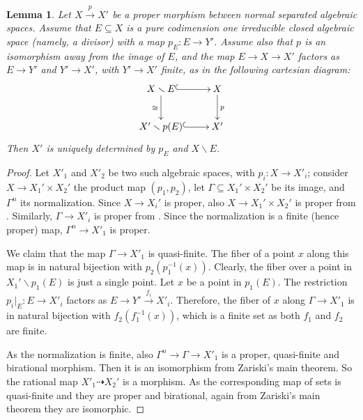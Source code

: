 \documentclass{amsart}
\newtheorem{Lemma}[theorem]{Lemma}
\theoremstyle{definition}
\begin{document}
\begin{Lemma}\label{lemma_isom_coarse_moduli_space}
    Let $X\xrightarrow{p} X'$ be a proper morphism between normal separated algebraic spaces. Assume that $E\subseteq X$ is a pure codimension one irreducible closed algebraic space (namely, a divisor) with a map $p_E:E\to Y'$. Assume also that $p$ is an isomorphism away from the image of $E$, and the map $E\to X\to X'$ factors as $E\to Y'$ and $Y'\to X'$, with $Y'\to X'$ finite, as in the following cartesian diagram:
    \[
    \xymatrix{X\smallsetminus E \ar@{^{(}->}[r]\ar[d]_\cong & X \ar[d]^p \\ X'\smallsetminus p(E)\ar@{^{(}->}[r]& X'}
    \]
    Then $X'$ is uniquely determined by $p_E$ and $X\smallsetminus E$. 
\end{Lemma}
\begin{proof}
    Let $X'_1$ and $X'_2$ be two such algebraic spaces, with $p_i:X\to X'_i$; consider $X\to X_1'\times X_2'$ the product map $(p_1, p_2)$, let $\Gamma\subseteq X_1'\times X_2'$
    be its image, and $\Gamma^n$ its normalization. Since $X\to X_i'$ is proper, also $X\to X_1'\times X_2'$ is proper from \cite[\href{https://stacks.math.columbia.edu/tag/04NX}{Tag 04NX}]{stacks-project}. Similarly, $\Gamma\to X'_i$ is proper from \cite[\href{https://stacks.math.columbia.edu/tag/0AGD}{Tag 0AGD}]{stacks-project}. Since the normalization is a finite (hence proper) map, $\Gamma^n\to X'_1$ is proper.
    
    We claim that the map $\Gamma\to X'_1$ is quasi-finite. {The fiber of a point $x$ along this map is in natural bijection with $p_2(p_1^{-1}(x))$. Clearly, the fiber over a point in $X_1'\smallsetminus p_1(E)$ is just a single point. Let $x$ be a point in  $p_1(E)$. The restriction $p_i|_E\colon E \to X'_i$ factors as $E \to Y' \overset{f_i}{\to} X'_i$. Therefore, the fiber of $x$ along $\Gamma \to X'_1$ is in natural bijection with $f_2(f_1^{-1}(x))$, which is a finite set as both $f_1$ and $f_2$ are finite.}
    
    

    As the normalization is finite, also $\Gamma^n\to \Gamma\to X'_1$ is a proper, quasi-finite and birational morphism. Then it is an isomorphism from Zariski's main theorem. So the rational map $X'_1\dashrightarrow X_2'$ is a morphism. As the corresponding map of sets is quasi-finite and they are proper and birational, again from Zariski's main theorem they are isomorphic.
\end{proof}
\end{document}

